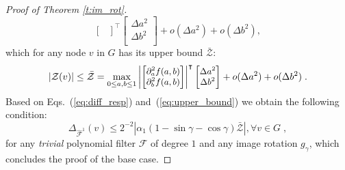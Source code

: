\documentclass[10pt,journal,compsoc]{IEEEtran}
\newcommand{\hmF}{\hat{\mathcal{F}}}
\newcommand{\norm}[1]{\left|#1\right|}
\begin{document}
\begin{proof}[Proof of Theorem \ref{t:im_rot}]
\begin{equation}
\begin{bmatrix}
		\end{bmatrix}^{\intercal}
		\begin{bmatrix}
		\Delta a^2 \\
		\Delta b^2 \\
		\end{bmatrix} + o(\Delta a^2) + o(\Delta b^2),
		\label{eq:sec_der_base}
		\end{equation}
		\noindent
		which for any node $v$ in $G$ has its upper bound $\bar{\mathcal{Z}}$:
		\begin{equation}
		\small
		\norm{\mathcal{Z}(v)} \leq \bar{\mathcal{Z}} =
		\max_{0 \leq a,b \leq 1} \left|
		\begin{bmatrix}
		\partial_a^2 f (a,b)\\
		\partial_b^2 f (a,b)\\
		\end{bmatrix}
		\right|^{\intercal}
		\begin{bmatrix}
		\Delta a^2 \\
		\Delta b^2 \\
		\end{bmatrix} + o(\Delta a^2) + o(\Delta b^2) \;.
		\label{eq:upper_bound}
		\end{equation}
		\noindent
		Based on Eqs.~(\ref{eq:diff_resp}) and~(\ref{eq:upper_bound}) we obtain the following condition:
		\begin{equation}
		\Delta_{\hmF^1}(v) \leq 2^{-2}\norm{\alpha_1(1 - \sin\gamma - \cos\gamma) \bar{\mathcal{Z}}}, \forall v \in G \;,
		\label{eq:filt_rot_single_fin}
		\end{equation}
		\noindent
		for any \emph{trivial} polynomial filter $\mathcal{F}$ of degree $1$ and any image rotation $g_\gamma$, which concludes the proof of the base case.



\end{proof}
\end{document}
